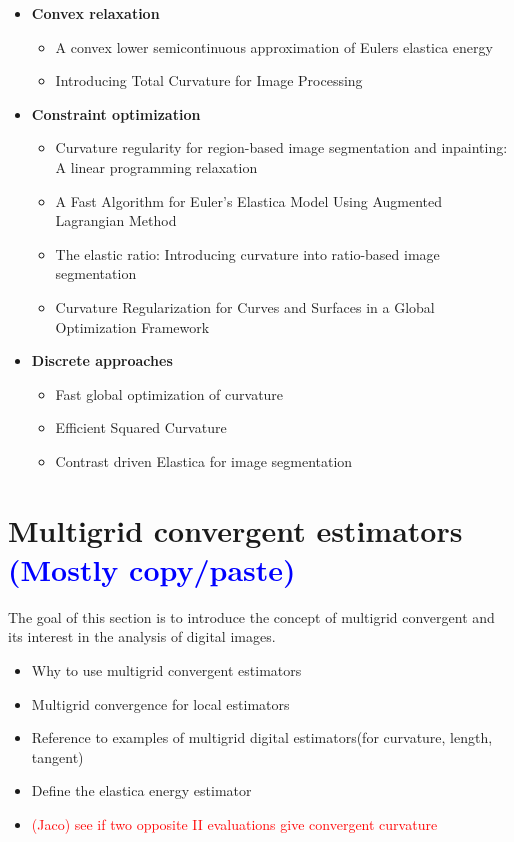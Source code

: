 \documentclass[runningheads]{llncs}
\newcommand{\todo}[1]{{\textcolor{blue}{#1}}}
\newcommand{\test}[1]{{\textcolor{red}{#1}}}
\begin{document}
\begin{itemize}
		\item{\textbf{Convex relaxation}}
	\begin{itemize}
			\item{A convex lower semicontinuous approximation of Eulers elastica energy \cite{bredies15convex}}				\item{Introducing Total Curvature for Image Processing \cite{goldluecke11totalcurvature}}
	\end{itemize}	
	
	\item{\textbf{Constraint optimization}}
	\begin{itemize}
		\item{Curvature regularity for region-based image segmentation and inpainting: A linear programming relaxation \cite{schoenemann09linear} }	
		\item{A Fast Algorithm for Euler's Elastica Model Using Augmented Lagrangian Method \cite{tai11elastica} }		
		\item{The elastic ratio: Introducing curvature into ratio-based image segmentation \cite{schoenemann2011elastic} }		
		\item{Curvature Regularization for Curves and Surfaces in a Global Optimization Framework \cite{strandmark11globalframework} }
	\end{itemize}

	\item{\textbf{Discrete approaches}}
	\begin{itemize}
		\item{Fast global optimization of curvature \cite{zehiry10fast}	}
		\item{Efficient Squared Curvature \cite{nieuwenhuis14efficient} 	}
		\item{Contrast driven {E}lastica for image segmentation \cite{el2016contrast} }	
	\end{itemize}
	
	



	
\end{itemize}

\section{Multigrid convergent estimators \todo{(Mostly copy/paste)}}
The goal of this section is to  introduce the concept of multigrid convergent and its interest in the analysis of digital images.
\begin{itemize}
	\item{Why to use multigrid convergent estimators}
	\item{Multigrid convergence for local estimators}
	\item{Reference to examples of multigrid digital estimators(for curvature, length, tangent)}
	\item{Define the elastica energy estimator}
	\item{\test{(Jaco) see if two opposite II evaluations give convergent curvature}}
\end{itemize}
\end{document}
